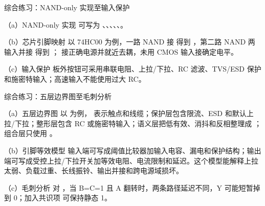 \begin{chapteranswer}{综合练习：NAND-only 实现至输入保护}
\begin{answersubproblem}{（a）NAND-only 实现}
可写为 、、、、、。
\end{answersubproblem}
\begin{answersubproblem}{（b）芯片引脚映射}
以 74HC00 为例，一路 NAND 接  得到 ，第二路 NAND 两输入并接  得到 ； 接正确电源并就近去耦，未用 CMOS 输入接确定电平。
\end{answersubproblem}
\begin{answersubproblem}{（c）输入保护}
板外按钮可采用串联电阻、上拉/下拉、RC 滤波、TVS/ESD 保护和施密特输入；高速输入不能使用过大 RC。
\end{answersubproblem}
\end{chapteranswer}

\begin{chapteranswer}{综合练习：五层边界图至毛刺分析}
\begin{answersubproblem}{（a）五层边界图}
以  为例， 表示触点和线缆；保护层包含限流、ESD 和默认上拉/下拉；整形层包含 RC 或施密特输入；语义层把低有效、消抖和反相整理成 ；组合层只使用 。
\end{answersubproblem}
\begin{answersubproblem}{（b）引脚等效模型}
输入端可写成阈值比较器加输入电容、漏电和保护结构；输出端可写成受控上拉/下拉开关加等效电阻、电流限制和延迟。这个模型能解释上拉太弱、负载过重、长线振铃、输出并接和跨电源域损坏。
\end{answersubproblem}
\begin{answersubproblem}{（c）毛刺分析}
对 ，当 B=C=1 且 A 翻转时，两条路径延迟不同，Y 可能短暂掉到 0；加入共识项  可保持静态 1。
\end{answersubproblem}
\end{chapteranswer}

